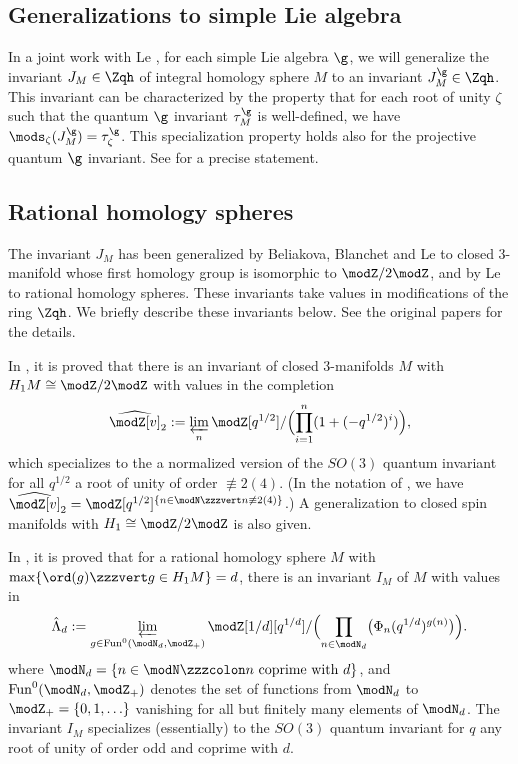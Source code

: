 \documentclass{amsart}
\numberwithin{equation}{section}
\numberwithin{figure}{section}
\theoremstyle{plain}
\theoremstyle{definition}
\theoremstyle{remark}
\begin{document}
\subsection{Generalizations to simple Lie algebra}
\label{sec:general}

In a joint work with Le \cite{H-Le:in-preparation}, for each simple
Lie algebra $\g$, we will generalize the invariant $J_M\in \Zqh$ of
integral homology sphere $M$ to an invariant $J^\g_M\in \Zqh$.  This
invariant can be characterized by the property that for each root of
unity $\zeta $ such that the quantum $\g$ invariant $\tau ^\g_M$ is
well-defined, we have $\mods _\zeta (J^\g_M)=\tau ^\g_\zeta $.  This specialization
property holds also for the projective quantum $\g$ invariant.  See
\cite[Conjecture 7.29]{Ohtsuki5} for a precise statement.

\subsection{Rational homology spheres}
\label{sec:rati-homol-spher}

The invariant $J_M$ has been generalized by Beliakova, Blanchet and Le
\cite{Beliakova-Blanchet-Le} to closed $3$-manifold whose first
homology group is isomorphic to $\modZ /2\modZ $, and by Le \cite{Le4} to
rational homology spheres.  These invariants take values in
modifications of the ring $\Zqh$.  We briefly describe these
invariants below.  See the original papers for the details.

In \cite{Beliakova-Blanchet-Le}, it is proved that there is an
invariant of closed $3$-manifolds $M$ with $H_1M\cong\modZ /2\modZ $ with
values in the completion
\begin{equation*}
  \widehat{\modZ [v]}_2
  :=\varprojlim_n\modZ [q^{1/2}]/\Bigl(\prod_{i=1}^n(1+(-q^{1/2})^i)\Bigr),
\end{equation*}
which specializes to the a normalized version of the $SO(3)$ quantum
invariant for all $q^{1/2}$ a root of unity of order $\not\equiv2(4)$.
(In the notation of \cite{H:cyclotomic}, we have
$\widehat{\modZ [v]}_2=\modZ [q^{1/2}]^{\{n\in \modN \zzzvert n\not\equiv2(4)\}}$.)  A
generalization to closed spin manifolds with $H_1\cong\modZ /2\modZ $ is also
given.

In \cite{Le4}, it is proved that for a rational homology sphere $M$
with $\max\{\ord(g)\zzzvert g\in H_1M\}=d$, there is an invariant $I_M$ of $M$
with values in
\begin{equation*}
  \hat\Lambda _d
  :=\varprojlim_{g\in \operatorname{Fun}^0(\modN _d,\modZ _+)}\modZ [1/d][q^{1/d}]/
  \Bigl(\prod_{n\in \modN _d}\bigl(\Phi _n(q^{1/d})^{g(n)}\bigr)\Bigr).
\end{equation*}
where $\modN _d=\{n\in \modN \zzzcolon \text{$n$ coprime with $d$}\}$, and
$\operatorname{Fun}^0(\modN _d,\modZ _+)$ denotes the set of functions from
$\modN _d$ to $\modZ _+=\{0,1,\ldots \}$ vanishing for all but finitely many
elements of $\modN _d$.  The invariant $I_M$ specializes (essentially) to
the $SO(3)$ quantum invariant for $q$ any root of unity of order odd
and coprime with $d$.
\end{document}
